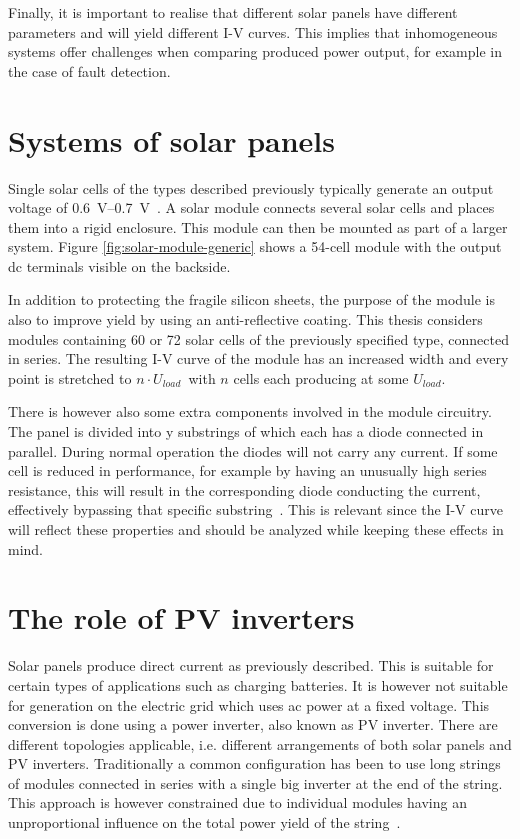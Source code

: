 Finally, it is important to realise that different solar panels have different parameters and will yield different I-V curves.
This implies that inhomogeneous systems offer challenges when comparing produced power output, for example in the case of fault detection.

\section{Systems of solar panels}
Single solar cells of the types described previously typically generate an output voltage of \SIrange{0.6}{0.7}{\volt}~\cite{Zhao2010thesis}.
A solar module connects several solar cells and places them into a rigid enclosure.
This module can then be mounted as part of a larger system.
Figure \ref{fig:solar-module-generic} shows a 54-cell module with the output dc terminals visible on the backside.


In addition to protecting the fragile silicon sheets, the purpose of the module is also to improve yield by using an anti-reflective coating.
This thesis considers modules containing 60 or 72 solar cells of the previously specified type, connected in series.
The resulting I-V curve of the module has an increased width and every point is stretched to $n \cdot U_{load}$ with $n$ cells each producing at some $U_{load}$.

There is however also some extra components involved in the module circuitry.
The panel is divided into y substrings of which each has a diode connected in parallel.
During normal operation the diodes will not carry any current.
If some cell is reduced in performance, for example by having an unusually high series resistance, this will result in the corresponding diode conducting the current, effectively bypassing that specific substring~\cite{Roman2006}.
This is relevant since the I-V curve will reflect these properties and should be analyzed while keeping these effects in mind.

\section{The role of PV inverters}
Solar panels produce direct current as previously described.
This is suitable for certain types of applications such as charging batteries.
It is however not suitable for generation on the electric grid which uses ac power at a fixed voltage.
This conversion is done using a power inverter, also known as PV inverter.
There are different topologies applicable, i.e. different arrangements of both solar panels and PV inverters.
Traditionally a common configuration has been to use long strings of modules connected in series with a single big inverter at the end of the string.
This approach is however constrained due to individual modules having an unproportional influence on the total power yield of the string~\cite{Roman2006}.

